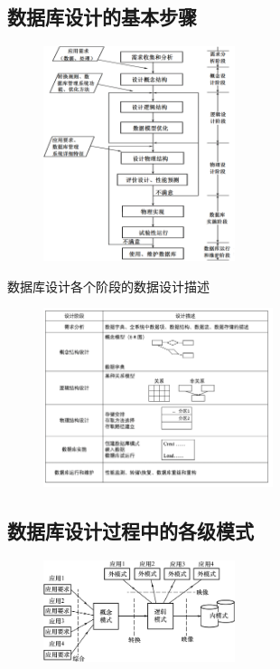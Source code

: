 \subsection{数据库设计的基本步骤}
\begin{figure}[H]
    \vspace{-0.5em}
	\centering
	\includegraphics[width=0.5\textwidth]{images/7.1.3}
    \vspace{-1em}
\end{figure}

数据库设计各个阶段的数据设计描述
\begin{figure}[H]
    \vspace{-0.5em}
	\centering
	\includegraphics[width=0.6\textwidth]{images/7.1.3.2}
    \vspace{-1em}
\end{figure}

\subsection{数据库设计过程中的各级模式}
\begin{figure}[H]
    \vspace{-0.5em}
	\centering
	\includegraphics[width=0.5\textwidth]{images/7.1.4}
    \vspace{-1em}
\end{figure}

